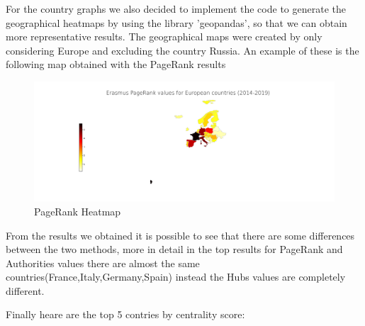     For the country graphs we also decided to implement the code to generate the geographical heatmaps by using the library
    'geopandas', so that we can obtain more representative results.
    The geographical maps were created by only considering Europe and excluding the country Russia.
    An example of these is the following map obtained with the PageRank results

    \begin{figure}[H]
        \centering
          \includegraphics[width=\linewidth]{../geoMaps/PR_geoMap.png}
          \caption{PageRank Heatmap}
         \label{fig:1}
        \end{figure}     

    From the results we obtained it is possible to see that there are some differences between the two methods,
    more in detail in the top results for PageRank and Authorities values there are almost the same countries(France,Italy,Germany,Spain)
     instead the Hubs values are completely different.
    
    Finally heare are the top 5 contries by centrality score:

